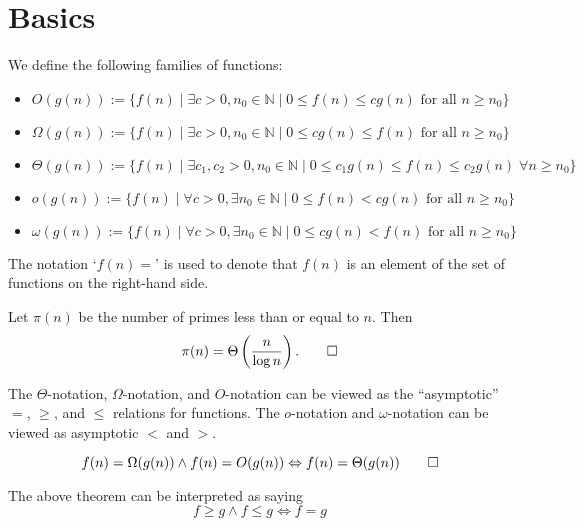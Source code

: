 \section{Basics}
\begin{definition}
We define the following families of functions:
\begin{itemize}[leftmargin=*]
    \item $O(g(n)) := \{ f(n) \mid \exists c > 0, n_0 \in \mathbb{N} \mid0 \leq f(n) \leq cg(n) \text{ for all } n \geq n_0 \}$
    \item $\Omega(g(n)) := \{ f(n) \mid \exists c > 0, n_0 \in \mathbb{N} \mid 0 \leq cg(n) \leq f(n) \text{ for all } n \geq n_0 \}$
    \item $\Theta(g(n)) := \{ f(n) \mid \exists c_1, c_2 > 0, n_0 \in \mathbb{N} \mid 0 \leq c_1g(n) \leq f(n) \leq c_2g(n) \; \forall n \geq n_0 \}$
    \item $o(g(n)) := \{ f(n) \mid \forall c > 0, \exists n_0 \in \mathbb{N} \mid 0 \leq f(n) < cg(n) \text{ for all } n \geq n_0 \}$
    \item $\omega(g(n)) := \{ f(n) \mid \forall c > 0, \exists n_0 \in \mathbb{N} \mid 0 \leq cg(n) < f(n) \text{ for all } n \geq n_0 \}$ \qedhere
\end{itemize}
\end{definition}



The notation `$f(n) =$' is used to denote that $f(n)$ is an element of the set of functions on the right-hand side.
\begin{example}
    Let $\pi(n)$ be the number of primes less than or equal to $n$. Then 
    \[
    \pi(n) = \Theta\left(\frac{n}{\log n}\right)
    \text{.} \qedhere
    \]
\end{example}

The $\Theta$-notation, $\Omega$-notation, and $O$-notation can be viewed as the ``asymptotic'' $=$, $\geq$, and $\leq$ relations for functions.
The $o$-notation and $\omega$-notation can be viewed as asymptotic $<$ and $>$.



\begin{theorem}
    \label{thm:O-and-Omega-imply-Theta}
    \leavevmode\setlength{\abovedisplayskip}{0pt}\vspace{-\baselineskip}
    \[
    f(n) = \Omega(g(n)) \wedge f(n) = O(g(n)) \Leftrightarrow f(n) = \Theta(g(n))
    \qedhere
    \]
\end{theorem}
The above theorem can be interpreted as saying
\[
f \geq g \wedge f \leq g \Leftrightarrow f = g
\] 

